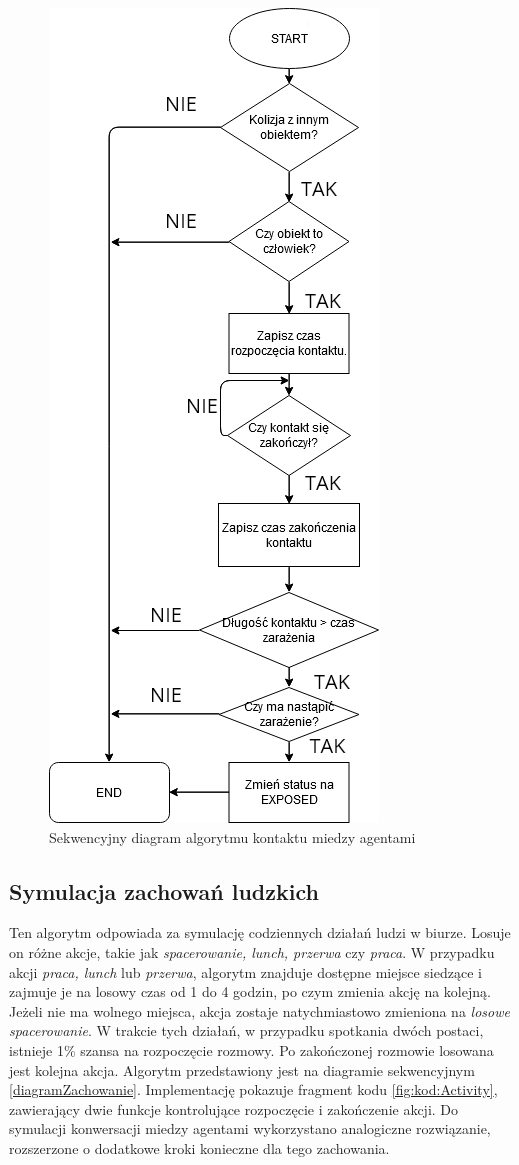 \begin{figure}[h!]
	\centering
	\includegraphics[width=0.6\linewidth]{DiagramKontaktu.png}
	\caption{Sekwencyjny diagram algorytmu kontaktu miedzy agentami}
	\label{diagramZarazanie}
\end{figure}

\subsection{Symulacja zachowań ludzkich}
Ten algorytm odpowiada za symulację codziennych działań ludzi w biurze. Losuje on różne akcje, takie jak \textit{spacerowanie, lunch, przerwa} czy \textit{praca}. W przypadku akcji \textit{praca, lunch} lub \textit{przerwa}, algorytm znajduje dostępne miejsce siedzące i zajmuje je na losowy czas od 1 do 4 godzin, po czym zmienia akcję na kolejną. Jeżeli nie ma wolnego miejsca, akcja zostaje natychmiastowo zmieniona na \textit{losowe spacerowanie}. W trakcie tych działań, w przypadku spotkania dwóch postaci, istnieje 1\% szansa na rozpoczęcie rozmowy. Po zakończonej rozmowie losowana jest kolejna akcja. Algorytm przedstawiony jest na diagramie sekwencyjnym \ref{diagramZachowanie}. Implementację pokazuje fragment kodu \ref{fig:kod:Activity}, zawierający dwie funkcje kontrolujące rozpoczęcie i zakończenie akcji. Do symulacji konwersacji miedzy agentami wykorzystano analogiczne rozwiązanie, rozszerzone o dodatkowe kroki konieczne dla tego zachowania.

